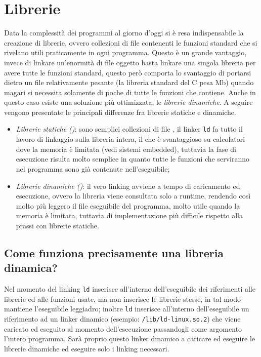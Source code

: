 \documentclass[class=book, crop=false, oneside]{standalone}
\begin{document}
\section{Librerie}
Data la complessità dei programmi al giorno d'oggi si è resa indispensabile la creazione di librerie, ovvero collezioni di file  contenenti le funzioni standard che si rivelano utili praticamente in ogni  programma.
Questo è un grande vantaggio, invece di linkare un'enormità di file oggetto basta linkare una singola libreria per avere tutte le funzioni standard, questo però comporta lo svantaggio di portarsi dietro un file relativamente pesante (la libreria standard del C pesa \unit[2,5]{Mb}) quando magari si necessita solamente di poche di tutte le funzioni che contiene.
Anche in questo caso esiste una soluzione più ottimizzata, le \emph{librerie dinamiche}. A seguire vengono presentate le principali differenze fra librerie statiche e dinamiche.
\begin{itemize}
	\item \emph{Librerie statiche ()}: sono semplici collezioni di file , il linker \texttt{ld} fa tutto il lavoro di linkaggio sulla libreria intera, il che è svantaggioso su calcolatori dove la memoria è limitata (vedi sistemi embedded), tuttavia la fase di esecuzione risulta molto semplice in quanto tutte le funzioni che serviranno nel programma sono già contenute nell'eseguibile;
	\item \emph{Librerie dinamiche ()}: il vero linking avviene a tempo di caricamento ed esecuzione, ovvero la libreria viene consultata solo a runtime, rendendo così molto più leggero il file eseguibile del programma, molto utile quando la memoria è limitata, tuttavia di implementazione più difficile rispetto alla prassi con librerie statiche.
\end{itemize}

\subsection{Come funziona precisamente una libreria dinamica?}
Nel momento del linking \texttt{ld} inserisce all'interno dell'eseguibile dei riferimenti alle librerie ed alle funzioni usate, ma non inserisce le librerie stesse, in tal modo mantiene l'eseguibile leggiadro; inoltre \texttt{ld} inserisce all'interno dell'eseguibile un riferimento ad un linker dinamico (esempio: \texttt{/lib/ld-linux.so.2}) che viene caricato ed eseguito al momento dell'esecuzione passandogli come argomento l'intero programma. Sarà proprio questo linker dinamico a caricare ed eseguire le librerie dinamiche ed eseguire solo i linking necessari.
\end{document}
